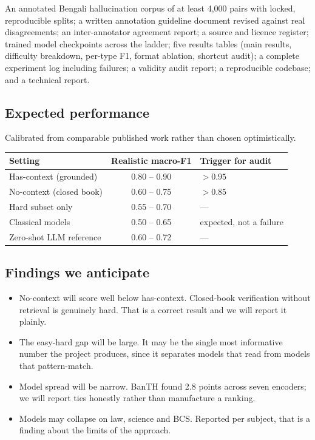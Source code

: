 \documentclass[12pt,a4paper]{article}
\begin{document}
An annotated Bengali hallucination corpus of at least 4{,}000 pairs with locked,
reproducible splits; a written annotation guideline document revised against
real disagreements; an inter-annotator agreement report; a source and licence
register; trained model checkpoints across the ladder; five results tables (main
results, difficulty breakdown, per-type F1, format ablation, shortcut audit); a
complete experiment log including failures; a validity audit report; a
reproducible codebase; and a technical report.

\subsection{Expected performance}

Calibrated from comparable published work rather than chosen optimistically.

\begin{center}
\begin{tabular}{L{5.2cm} c L{4.8cm}}
\toprule
\textbf{Setting} & \textbf{Realistic macro-F1} & \textbf{Trigger for audit} \\
\midrule
Has-context (grounded) & 0.80 -- 0.90 & $> 0.95$ \\
No-context (closed book) & 0.60 -- 0.75 & $> 0.85$ \\
Hard subset only & 0.55 -- 0.70 & --- \\
Classical models & 0.50 -- 0.65 & expected, not a failure \\
Zero-shot LLM reference & 0.60 -- 0.72 & --- \\
\bottomrule
\end{tabular}
\end{center}

\subsection{Findings we anticipate}

\begin{itemize}[leftmargin=*,itemsep=3pt]
  \item No-context will score well below has-context. Closed-book
  verification without retrieval is genuinely hard. That is a correct result and
  we will report it plainly.
  \item The easy-hard gap will be large. It may be the single most
  informative number the project produces, since it separates models that read
  from models that pattern-match.
  \item Model spread will be narrow. BanTH found 2.8 points across
  seven encoders; we will report ties honestly rather than manufacture a ranking.
  \item Models may collapse on law, science and BCS. Reported per
  subject, that is a finding about the limits of the approach.
\end{itemize}
\end{document}
